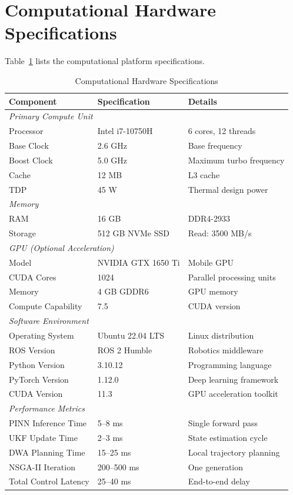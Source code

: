 \section{Computational Hardware Specifications}
\label{sec:hardware_params}

Table~\ref{tab:hardware_specs} lists the computational platform specifications.

\begin{table}[htbp]
\centering
\caption{Computational Hardware Specifications}
\label{tab:hardware_specs}
\begin{tabular}{@{}lll@{}}
\toprule
\textbf{Component} & \textbf{Specification} & \textbf{Details} \\
\midrule
\multicolumn{3}{l}{\textit{Primary Compute Unit}} \\
Processor & Intel i7-10750H & 6 cores, 12 threads \\
Base Clock & 2.6 GHz & Base frequency \\
Boost Clock & 5.0 GHz & Maximum turbo frequency \\
Cache & 12 MB & L3 cache \\
TDP & 45 W & Thermal design power \\
\midrule
\multicolumn{3}{l}{\textit{Memory}} \\
RAM & 16 GB & DDR4-2933 \\
Storage & 512 GB NVMe SSD & Read: 3500 MB/s \\
\midrule
\multicolumn{3}{l}{\textit{GPU (Optional Acceleration)}} \\
Model & NVIDIA GTX 1650 Ti & Mobile GPU \\
CUDA Cores & 1024 & Parallel processing units \\
Memory & 4 GB GDDR6 & GPU memory \\
Compute Capability & 7.5 & CUDA version \\
\midrule
\multicolumn{3}{l}{\textit{Software Environment}} \\
Operating System & Ubuntu 22.04 LTS & Linux distribution \\
ROS Version & ROS 2 Humble & Robotics middleware \\
Python Version & 3.10.12 & Programming language \\
PyTorch Version & 1.12.0 & Deep learning framework \\
CUDA Version & 11.3 & GPU acceleration toolkit \\
\midrule
\multicolumn{3}{l}{\textit{Performance Metrics}} \\
PINN Inference Time & 5--8 ms & Single forward pass \\
UKF Update Time & 2--3 ms & State estimation cycle \\
DWA Planning Time & 15--25 ms & Local trajectory planning \\
NSGA-II Iteration & 200--500 ms & One generation \\
Total Control Latency & 25--40 ms & End-to-end delay \\
\bottomrule
\end{tabular}
\end{table}

\clearpage
